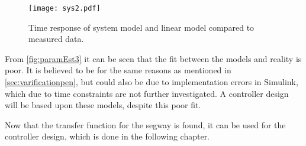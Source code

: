 \begin{figure}[H]
    \centering
    \texttt{[image: sys2.pdf]}
    \caption{Time response of system model and linear model compared to measured data.}
    \label{fig:paramEst3}
\end{figure} 
\vspace{-0.7 cm}
From \autoref{fig:paramEst3} it can be seen that the fit between the models and reality is poor. It is believed to be for the same reasons as mentioned in \autoref{sec:varificationpen}, but could also be due to implementation errors in Simulink, which due to time constraints are not further investigated. A controller design will be based upon these models, despite this poor fit.

Now that the transfer function for the segway is found, it can be used for the controller design, which is done in the following chapter. 
